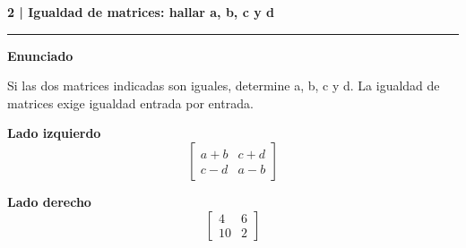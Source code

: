 \documentclass[11pt,a4paper,landscape]{article}
\newcommand{\titulo}[1]{{\LARGE\bfseries #1}\par\smallskip\hrule\medskip}
\begin{document}
\newpage{}\hypertarget{1.2-2}{}
\titulo{2 | Igualdad de matrices: hallar a, b, c y d}
\textbf{Enunciado}\par Si las dos matrices indicadas son iguales, determine a, b, c y d. La igualdad de matrices exige igualdad entrada por entrada.
\par\smallskip \begin{minipage}[t]{.47\linewidth}\centering \textbf{Lado izquierdo}\[\begin{bmatrix}a + b & c + d\\c - d & a - b\end{bmatrix}\]\end{minipage}\hfill\begin{minipage}[t]{.47\linewidth}\centering \textbf{Lado derecho}\[\begin{bmatrix}4 & 6\\10 & 2\end{bmatrix}\]\end{minipage}\par\smallskip
\end{document}
